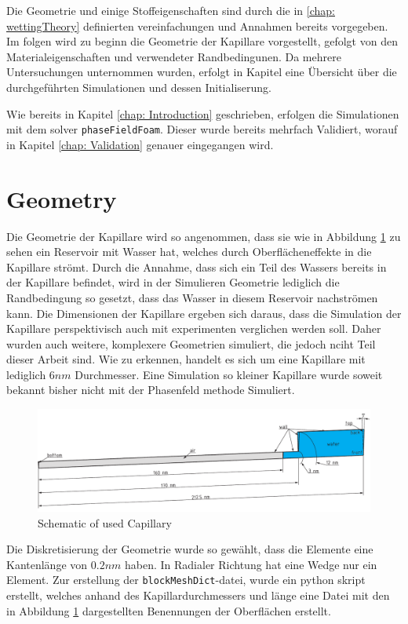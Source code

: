 Die Geometrie und einige Stoffeigenschaften sind durch die in \ref{chap: wettingTheory} definierten vereinfachungen und Annahmen bereits vorgegeben. Im folgen wird zu beginn die Geometrie der Kapillare vorgestellt, gefolgt von den Materialeigenschaften und verwendeter Randbedingunen. Da mehrere Untersuchungen unternommen wurden, erfolgt in Kapitel eine Übersicht über die durchgeführten Simulationen und dessen Initialiserung. 


Wie bereits in Kapitel \ref{chap: Introduction} geschrieben, erfolgen die Simulationen mit dem solver \texttt{phaseFieldFoam}. Dieser wurde bereits mehrfach Validiert, worauf in Kapitel \ref{chap: Validation} genauer eingegangen wird.
\section{Geometry}
Die Geometrie der Kapillare wird so angenommen, dass sie wie in Abbildung \ref{fig: Capillary Geometry} zu sehen ein Reservoir mit Wasser hat, welches durch Oberflächeneffekte in die Kapillare strömt. Durch die Annahme, dass sich ein Teil des Wassers bereits in der Kapillare befindet, wird in der Simulieren Geometrie lediglich die Randbedingung so gesetzt, dass das Wasser in diesem Reservoir nachströmen kann. Die Dimensionen der Kapillare ergeben sich daraus, dass die Simulation der Kapillare perspektivisch auch mit experimenten verglichen werden soll. Daher wurden auch weitere, komplexere Geometrien simuliert, die jedoch nciht Teil dieser Arbeit sind. 
Wie zu erkennen, handelt es sich um eine Kapillare mit lediglich $6nm$ Durchmesser. Eine Simulation so kleiner Kapillare wurde soweit bekannt bisher nicht mit der Phasenfeld methode Simuliert.

\begin{figure}[h]
    \centering
    \includegraphics[width=.95\textwidth]{Pictures/Cap_5DEG.pdf}
    \caption{Schematic of used Capillary}
    \label{fig: Capillary Geometry}
\end{figure}

Die Diskretisierung der Geometrie wurde so gewählt, dass die Elemente eine Kantenlänge von $0.2nm$ haben. In Radialer Richtung hat eine Wedge nur ein Element. Zur erstellung der \texttt{blockMeshDict}-datei, wurde ein python skript erstellt, welches anhand des Kapillardurchmessers und länge eine Datei mit den in Abbildung \ref{fig: Capillary Geometry} dargestellten Benennungen der Oberflächen erstellt. 

